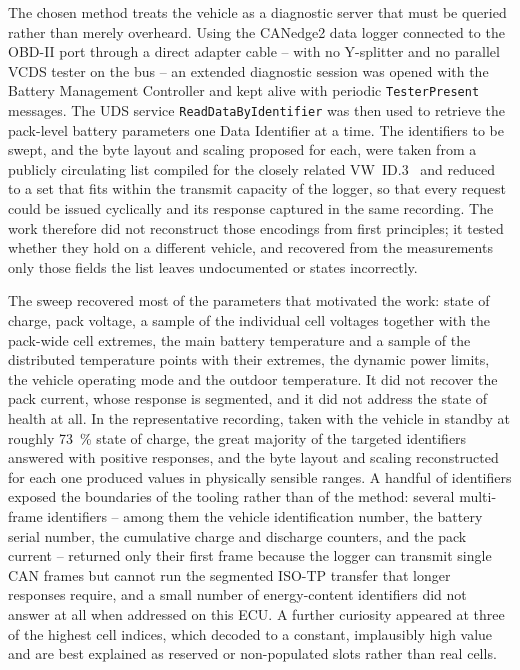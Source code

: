 \documentclass[11pt,a4paper,oneside,parskip=half]{scrreprt}
\begin{document}
The chosen method treats the vehicle as a diagnostic server that must be queried rather than merely overheard. Using the CANedge2 data logger connected to the OBD-II port through a direct adapter cable -- with no Y-splitter and no parallel VCDS tester on the bus -- an extended diagnostic session was opened with the Battery Management Controller and kept alive with periodic \texttt{TesterPresent} messages. The UDS service \texttt{ReadDataByIdentifier} was then used to retrieve the pack-level battery parameters one Data Identifier at a time. The identifiers to be swept, and the byte layout and scaling proposed for each, were taken from a publicly circulating list compiled for the closely related VW~ID.3~\cite{vwmebpidlist} and reduced to a set that fits within the transmit capacity of the logger, so that every request could be issued cyclically and its response captured in the same recording. The work therefore did not reconstruct those encodings from first principles; it tested whether they hold on a different vehicle, and recovered from the measurements only those fields the list leaves undocumented or states incorrectly.

The sweep recovered most of the parameters that motivated the work: state of charge, pack voltage, a sample of the individual cell voltages together with the pack-wide cell extremes, the main battery temperature and a sample of the distributed temperature points with their extremes, the dynamic power limits, the vehicle operating mode and the outdoor temperature. It did not recover the pack current, whose response is segmented, and it did not address the state of health at all. In the representative recording, taken with the vehicle in standby at roughly 73~\% state of charge, the great majority of the targeted identifiers answered with positive responses, and the byte layout and scaling reconstructed for each one produced values in physically sensible ranges. A handful of identifiers exposed the boundaries of the tooling rather than of the method: several multi-frame identifiers -- among them the vehicle identification number, the battery serial number, the cumulative charge and discharge counters, and the pack current -- returned only their first frame because the logger can transmit single CAN frames but cannot run the segmented ISO-TP transfer that longer responses require, and a small number of energy-content identifiers did not answer at all when addressed on this ECU. A further curiosity appeared at three of the highest cell indices, which decoded to a constant, implausibly high value and are best explained as reserved or non-populated slots rather than real cells.
\end{document}
